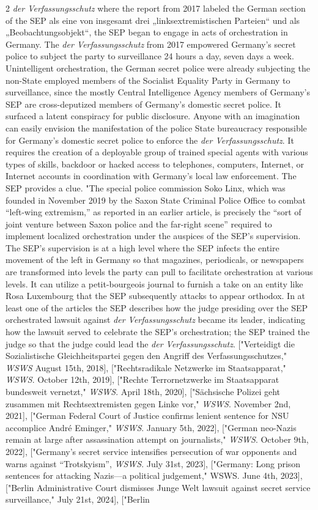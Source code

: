 \documentclass[10pt,a4paper,twoside]{article} %
\begin{document}
\begin{multicols}{2}
{{\emph{der Verfassungsschutz} where the report from 2017 labeled the German section of the SEP \textgerman{als eine von insgesamt drei „linksextremistischen Parteien“ und als „Beobachtungsobjekt“}, the SEP began to engage in acts of orchestration in Germany. The \emph{der Verfassungsschutz} from 2017 empowered Germany's secret police to subject the party to surveillance 24 hours a day, seven days a week.  Unintelligent orchestration, the German secret police were already subjecting the non-State employed members of the Socialist Equality Party in Germany to surveillance, since the mostly Central Intelligence Agency members of Germany's SEP are cross-deputized members of Germany's domestic secret police. It surfaced a latent conspiracy for public disclosure. Anyone with an imagination can easily envision the manifestation of the police State bureaucracy responsible for Germany's domestic secret police to enforce the \emph{der Verfassungsschutz}. It requires the creation of a deployable group of trained special agents with various types of skills, backdoor or hacked access to telephones, computers, Internet, or Internet accounts in coordination with Germany's local law enforcement. The SEP provides a clue. "The special police commission Soko Linx, which was founded in November 2019 by the Saxon State Criminal Police Office to combat “left-wing extremism,” as reported in an earlier article, is precisely the “sort of joint venture between Saxon police and the far-right scene” required to implement localized orchestration under the auspices of the SEP's supervision. The SEP's supervision is at a high level where the SEP infects the entire movement of the left in Germany so that magazines, periodicals, or newspapers are transformed into levels the party can pull to facilitate orchestration at various levels. It can utilize a petit-bourgeois journal to furnish a take on an entity like Rosa Luxembourg that the SEP subsequently attacks to appear orthodox. In at least one of the articles the SEP describes how the judge presiding over the SEP orchestrated lawsuit against \emph{der Verfassungsschutz} became its leader, indicating how the lawsuit served to celebrate the SEP's orchestration; the SEP trained the judge so that the judge could lead the \emph{der Verfassungsschutz}. ["Verteidigt die Sozialistische Gleichheitspartei gegen den Angriff des Verfassungsschutzes," \emph{WSWS} August 15th, 2018], ["Rechtsradikale Netzwerke im Staatsapparat," \emph{WSWS}. October 12th, 2019], ["Rechte Terrornetzwerke im Staatsapparat bundesweit vernetzt," \emph{WSWS}. April 18th, 2020], ["Sächsische Polizei geht zusammen mit Rechtsextremisten gegen Linke vor," \emph{WSWS}. November 2nd, 2021], ["German Federal Court of Justice confirms lenient sentence for NSU accomplice André Eminger," \emph{WSWS}. January 5th, 2022], ["German neo-Nazis remain at large after assassination attempt on journalists," \emph{WSWS}. October 9th, 2022], ["Germany’s secret service intensifies persecution of war opponents and warns against “Trotskyism”, \emph{WSWS}. July 31st, 2023], ["Germany: Long prison sentences for attacking Nazis—a political judgement," WSWS. June 4th, 2023], ["Berlin Administrative Court dismisses Junge Welt lawsuit against secret service surveillance," July 21st, 2024], ["Berlin }}
\end{multicols}
\end{document}
